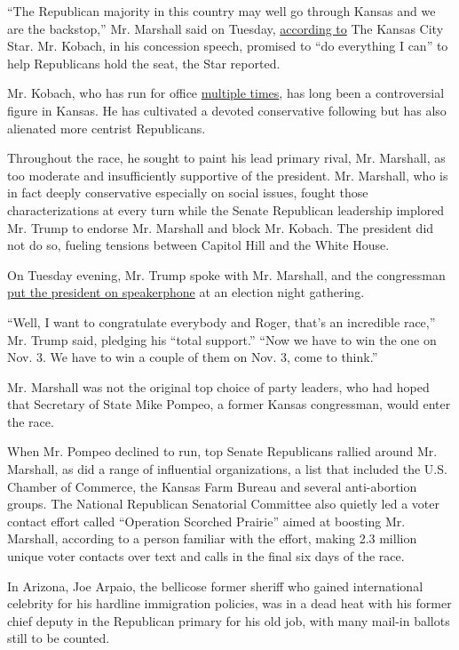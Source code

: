``The Republican majority in this country may well go through Kansas and
we are the backstop,'' Mr. Marshall said on Tuesday,
\href{https://www.kansascity.com/news/politics-government/election/article244717957.html}{according
to} The Kansas City Star. Mr. Kobach, in his concession speech, promised
to ``do everything I can'' to help Republicans hold the seat, the Star
reported.

Mr. Kobach, who has run for office
\href{https://www.nytimes3xbfgragh.onion/2017/06/13/magazine/the-man-behind-trumps-voter-fraud-obsession.html}{multiple
times}, has long been a controversial figure in Kansas. He has
cultivated a devoted conservative following but has also alienated more
centrist Republicans.

Throughout the race, he sought to paint his lead primary rival, Mr.
Marshall, as too moderate and insufficiently supportive of the
president. Mr. Marshall, who is in fact deeply conservative especially
on social issues, fought those characterizations at every turn while the
Senate Republican leadership implored Mr. Trump to endorse Mr. Marshall
and block Mr. Kobach. The president did not do so, fueling tensions
between Capitol Hill and the White House.

On Tuesday evening, Mr. Trump spoke with Mr. Marshall, and the
congressman
\href{https://twitter.com/RogerMarshallMD/status/1290840935807549440?s=20}{put
the president on speakerphone} at an election night gathering.

``Well, I want to congratulate everybody and Roger, that's an incredible
race,'' Mr. Trump said, pledging his ``total support.'' ``Now we have to
win the one on Nov. 3. We have to win a couple of them on Nov. 3, come
to think.''

Mr. Marshall was not the original top choice of party leaders, who had
hoped that Secretary of State Mike Pompeo, a former Kansas congressman,
would enter the race.

When Mr. Pompeo declined to run, top Senate Republicans rallied around
Mr. Marshall, as did a range of influential organizations, a list that
included the U.S. Chamber of Commerce, the Kansas Farm Bureau and
several anti-abortion groups. The National Republican Senatorial
Committee also quietly led a voter contact effort called ``Operation
Scorched Prairie'' aimed at boosting Mr. Marshall, according to a person
familiar with the effort, making 2.3 million unique voter contacts over
text and calls in the final six days of the race.

In Arizona, Joe Arpaio, the bellicose former sheriff who gained
international celebrity for his hardline immigration policies, was in a
dead heat with his former chief deputy in the Republican primary for his
old job, with many mail-in ballots still to be counted.

